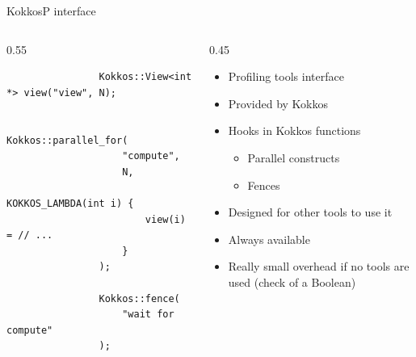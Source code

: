 \documentclass[
    aspectratio=169,
    \createHandout
]{beamer}
\begin{document}
\begin{frame}[fragile]{KokkosP interface}
    \begin{columns}
        \begin{column}{0.55\linewidth}
            \begin{verbatim}
                Kokkos::View<int *> view("view", N);

                Kokkos::parallel_for(
                    "compute",
                    N,
                    KOKKOS_LAMBDA(int i) {
                        view(i) = // ...
                    }
                );

                Kokkos::fence(
                    "wait for compute"
                );
            \end{verbatim}
        \end{column}
        \begin{column}{0.45\linewidth}
            \begin{itemize}
                \item Profiling tools interface
                \item Provided by Kokkos
                \item Hooks in Kokkos functions
                \begin{itemize}
                    \item Parallel constructs
                    \item Fences
                \end{itemize}
                \item Designed for other tools to use it
                \item Always available
                \item Really small overhead if no tools are used (check of a Boolean)
            \end{itemize}
        \end{column}
    \end{columns}
\end{frame}
\end{document}
